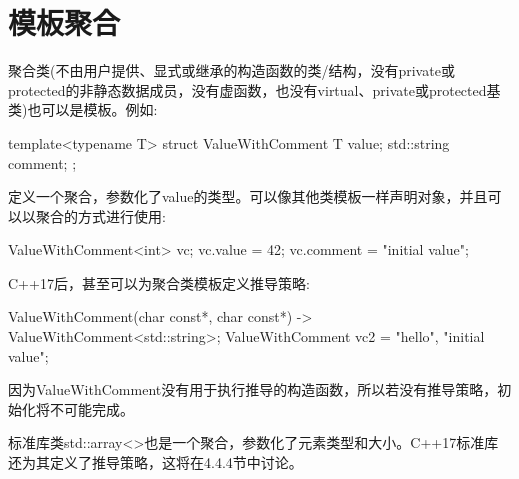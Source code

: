 \section{模板聚合}

聚合类(不由用户提供、显式或继承的构造函数的类/结构，没有private或protected的非静态数据成员，没有虚函数，也没有virtual、private或protected基类)也可以是模板。例如:

\begin{cpp}
template<typename T>
struct ValueWithComment {
	T value;
	std::string comment;
};
\end{cpp}

定义一个聚合，参数化了value的类型。可以像其他类模板一样声明对象，并且可以以聚合的方式进行使用:

\begin{cpp}
ValueWithComment<int> vc;
vc.value = 42;
vc.comment = "initial value";
\end{cpp}

C++17后，甚至可以为聚合类模板定义推导策略:

\begin{cpp}
ValueWithComment(char const*, char const*)
	-> ValueWithComment<std::string>;
ValueWithComment vc2 = {"hello", "initial value"};
\end{cpp}

因为ValueWithComment没有用于执行推导的构造函数，所以若没有推导策略，初始化将不可能完成。

标准库类std::array<>也是一个聚合，参数化了元素类型和大小。C++17标准库还为其定义了推导策略，这将在4.4.4节中讨论。
